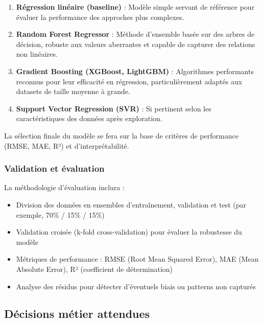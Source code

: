 \documentclass[12pt,a4paper]{article}
\begin{document}
\begin{enumerate}[leftmargin=*]
    \item \textbf{Régression linéaire (baseline)} : Modèle simple servant de référence pour évaluer la performance des approches plus complexes.
    
    \item \textbf{Random Forest Regressor} : Méthode d'ensemble basée sur des arbres de décision, robuste aux valeurs aberrantes et capable de capturer des relations non linéaires.
    
    \item \textbf{Gradient Boosting (XGBoost, LightGBM)} : Algorithmes performants reconnus pour leur efficacité en régression, particulièrement adaptés aux datasets de taille moyenne à grande.
    
    \item \textbf{Support Vector Regression (SVR)} : Si pertinent selon les caractéristiques des données après exploration.
\end{enumerate}

La sélection finale du modèle se fera sur la base de critères de performance (RMSE, MAE, R²) et d'interprétabilité.

\subsubsection{Validation et évaluation}

La méthodologie d'évaluation inclura :

\begin{itemize}[leftmargin=*]
    \item Division des données en ensembles d'entraînement, validation et test (par exemple, 70\% / 15\% / 15\%)
    \item Validation croisée (k-fold cross-validation) pour évaluer la robustesse du modèle
    \item Métriques de performance : RMSE (Root Mean Squared Error), MAE (Mean Absolute Error), R² (coefficient de détermination)
    \item Analyse des résidus pour détecter d'éventuels biais ou patterns non capturés
\end{itemize}

\newpage

\subsection{Décisions métier attendues}
\end{document}

